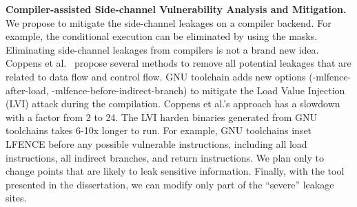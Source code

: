 \textbf{Compiler-assisted Side-channel Vulnerability Analysis and Mitigation.}
We propose to mitigate the side-channel leakages on a compiler backend. For example, the conditional execution can be eliminated by using the masks. Eliminating side-channel leakages from compilers is not a brand new idea. Coppens et al.~\cite{Coppens:2009:PMT:1607723.1608124} propose several methods to remove all potential leakages that are related to data flow and control flow.  GNU toolchain adds new options (\textsf{-mlfence-after-load}, \textsf{-mlfence-before-indirect-branch}) to mitigate the Load Value Injection (LVI) attack during the compilation. Coppens et al.'s approach has a slowdown with a factor from 2 to 24. The LVI harden binaries generated from GNU toolchains takes 6-10x longer to run.  For example, GNU toolchains inset LFENCE before any possible vulnerable instructions, including all load instructions, all indirect branches, and return instructions. We plan only to change points that are likely to leak sensitive information. Finally, with the tool presented in the dissertation, we can modify only part of the ``severe'' leakage sites.